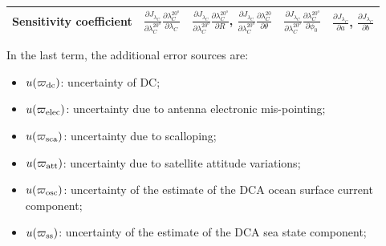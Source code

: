 \begin{table}[h]
\begin{tabularx}{\textwidth}{l | X | X | X | X}
			\midrule
			\textbf{Sensitivity coefficient} & $\frac{\partial J_{\lambda_{C}}}{\partial \lambda_C^{20^{o}}} \frac{\partial \lambda_C^{20^{o}}}{\partial \lambda_C}$ & $\frac{\partial J_{\lambda_{C}}}{\partial \lambda_C^{20^{o}}} \frac{\partial \lambda_C^{20^{o}}}{\partial R}$, $\frac{\partial J_{\lambda_{C}}}{\partial \lambda_C^{20^{o}}} \frac{\partial \lambda_C^{20}}{\partial \theta}$ & $\frac{\partial J_{\lambda_{C}}}{\partial \lambda_C^{20^{o}}} \frac{\partial \lambda_C^{20^{o}}}{\partial \phi_0}$ & $\frac{\partial J_{\lambda_{C}}}{\partial a}$, $\frac{\partial J_{\lambda_{C}}}{\partial b}$ \\
			\bottomrule
		\end{tabularx}
        \label{tab: effects JlC}
	\end{table}


In the last term, the additional error sources are:
\begin{itemize}
	\item $u(\varpi_{\rm dc})$: uncertainty of \ac{DC};
	\item $u(\varpi_{\rm elec})$: uncertainty due to antenna electronic mis-pointing;
	\item $u(\varpi_{\rm sca})$: uncertainty due to scalloping;
	\item $u(\varpi_{\rm att})$: uncertainty due to satellite attitude variations;
	\item $u(\varpi_{\rm osc})$: uncertainty of the estimate of the DCA ocean surface current component;
	\item $u(\varpi_{\rm ss})$: uncertainty of the estimate of the DCA sea state component;
\end{itemize}

